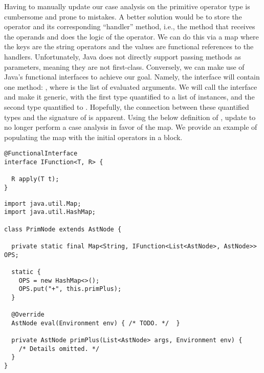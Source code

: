  Having to manually update our case analysis on the primitive operator type is cumbersome and prone to mistakes. A better solution would be to store the operator and its corresponding ``handler'' method, i.e., the method that receives the operands and does the logic of the operator. We can do this via a map where the keys are the string operators and the values are functional references to the handlers. Unfortunately, Java does not directly support passing methods as parameters, meaning they are not first-class. Conversely, we can make use of Java's functional interfaces to achieve our goal. Namely, the interface will contain one method: , where  is the list of evaluated arguments. We will call the interface  and make it generic, with the first type quantified to a list of  instances, and the second type quantified to . Hopefully, the connection between these quantified types and the signature of  is apparent. Using the below definition of , update  to no longer perform a case analysis in favor of the map. We provide an example of populating the map with the initial operators in a  block.

\begin{lstlisting}[language=MyJava]
@FunctionalInterface
interface IFunction<T, R> {
  
  R apply(T t);
}
\end{lstlisting}

\begin{lstlisting}[language=MyJava]
import java.util.Map;
import java.util.HashMap;

class PrimNode extends AstNode {
  
  private static final Map<String, IFunction<List<AstNode>, AstNode>> OPS;
  
  static {
    OPS = new HashMap<>();
    OPS.put("+", this.primPlus);
  }

  @Override
  AstNode eval(Environment env) { /* TODO. */  }

  private AstNode primPlus(List<AstNode> args, Environment env) { 
    /* Details omitted. */ 
  }
}
\end{lstlisting}


